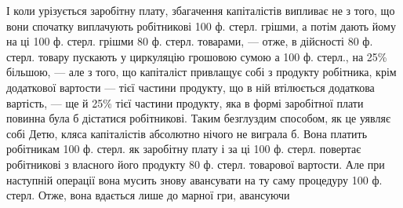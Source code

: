 І коли урізується заробітну плату, збагачення капіталістів випливає
не з того, що вони спочатку виплачують робітникові 100 ф. стерл.
грішми, а потім дають йому на ці 100 ф. стерл. грішми 80 ф. стерл.
товарами, — отже, в дійсності 80 ф. стерл. товару пускають у циркуляцію
грошовою сумою а 100 ф. стерл., на 25\% більшою, — але з того, що капіталіст
привлащує собі з продукту робітника, крім додаткової вартости — тієї
частини продукту, що в ній втілюється додаткова вартість, — ще й
25\% тієї частини продукту, яка в формі заробітної плати повинна була
б дістатися робітникові. Таким безглуздим способом, як це уявляє собі Детю,
кляса капіталістів абсолютно нічого не виграла б. Вона платить робітникам
100 ф. стерл. як заробітну плату і за ці 100 ф. стерл. повертає робітникові
з власного його продукту 80 ф. стерл. товарової вартости. Але
при наступній операції вона мусить знову авансувати на ту саму процедуру
100 ф. стерл. Отже, вона вдається лише до марної гри, авансуючи
\parbreak{}  %

